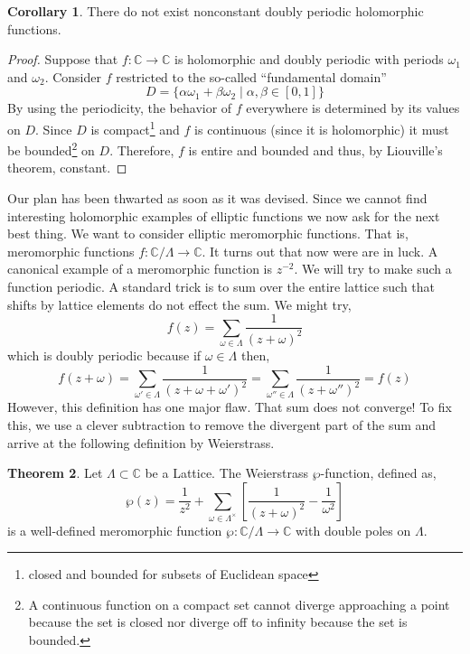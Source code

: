 \documentclass{article}
\newcommand{\C}{\mathbb{C}}
\theoremstyle{definition}
\newtheorem{theorem}{Theorem}[section]
\newtheorem{corollary}[theorem]{Corollary}
\begin{document}
\begin{corollary}
There do not exist nonconstant doubly periodic holomorphic functions.
\end{corollary}

\begin{proof}
Suppose that $f : \C \to \C$ is holomorphic and doubly periodic with periods $\omega_1$ and $\omega_2$. Consider $f$ restricted to the so-called ``fundamental domain''
\[ D = \{ \alpha \omega_1 + \beta \omega_2 \mid \alpha, \beta \in [0, 1] \} \]
By using the periodicity, the behavior of $f$ everywhere is determined by its values on $D$. 
Since $D$ is compact\footnote{closed and bounded for subsets of Euclidean space} and $f$ is continuous (since it is holomorphic) it must be bounded\footnote{A continuous function on a compact set cannot diverge approaching a point because the set is closed nor diverge off to infinity because the set is bounded.} on $D$. Therefore, $f$ is entire and bounded and thus, by Liouville's theorem, constant. 
\end{proof}
Our plan has been thwarted as soon as it was devised. Since we cannot find interesting holomorphic examples of elliptic functions we now ask for the next best thing.
We want to consider elliptic meromorphic functions. That is, meromorphic functions $f : \C / \Lambda \to \C$. It turns out that now were are in luck. A canonical example of a meromorphic function is $z^{-2}$. We will try to make such a function periodic. A standard trick is to sum over the entire lattice such that shifts by lattice elements do not effect the sum. We might try,
\[ f(z) = \sum_{\omega \in \Lambda} \frac{1}{(z + \omega)^2} \] 
which is doubly periodic because if $\omega \in \Lambda$ then,
\[ f(z + \omega) = \sum_{\omega' \in \Lambda} \frac{1}{(z + \omega + \omega')^2} = \sum_{\omega'' \in \Lambda} \frac{1}{(z + \omega'')^2} = f(z) \]
However, this definition has one major flaw. That sum does not converge! To fix this, we use a clever subtraction to remove the divergent part of the sum and arrive at the following definition by Weierstrass. 
\begin{theorem}
Let $\Lambda \subset \C$ be a Lattice. The Weierstrass $\wp$-function, defined as,
\[ \wp(z) = \frac{1}{z^2} + \sum_{\omega \in \Lambda^\times } \left[ \frac{1}{(z + \omega)^2} - \frac{1}{\omega^2} \right] \]
is a well-defined meromorphic function $\wp : \C / \Lambda \to \C$ with double poles on $\Lambda$. 
\end{theorem}
\end{document}
